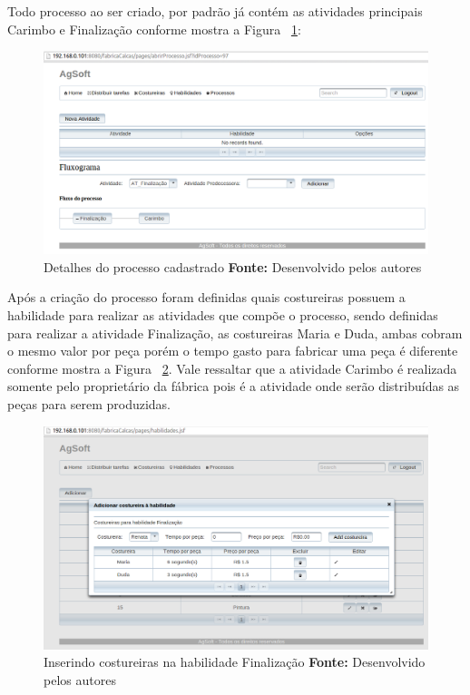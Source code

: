 \par Todo processo ao ser criado, por padrão já contém as atividades principais
 Carimbo e Finalização conforme mostra a Figura ~\ref{fig:processo_cadastrado}:

\begin{figure}[h!]
	\centerline{\includegraphics[scale=0.4]{./imagens/tela_processo_teste1.png}}
	\caption[Detalhes do processo cadastrado]
	{Detalhes do processo cadastrado \textbf{Fonte:} Desenvolvido pelos autores}
	\label{fig:processo_cadastrado}
\end{figure}

\par Após a criação do processo foram definidas quais costureiras possuem a
habilidade para realizar as atividades que compõe o processo, sendo definidas para 
realizar a atividade Finalização, as costureiras Maria e Duda, ambas cobram o 
mesmo valor por peça porém o tempo gasto para fabricar uma peça é diferente 
conforme mostra a Figura ~\ref{fig:costureira_habilidade}. Vale ressaltar que
a atividade Carimbo é realizada somente pelo proprietário da fábrica pois é a
atividade onde serão distribuídas as peças para serem produzidas. 

\newpage

\begin{figure}[h!]
	\centerline{\includegraphics[scale=0.4]{./imagens/tela_habilidade_teste1.png}}
	\caption[Inserindo costureiras na habilidade Finalização]
	{Inserindo costureiras na habilidade Finalização \textbf{Fonte:} Desenvolvido
	pelos autores}
	\label{fig:costureira_habilidade}
\end{figure}



